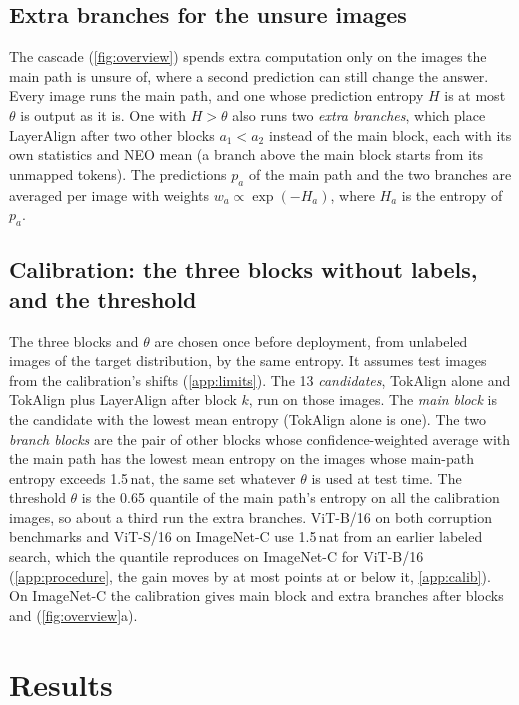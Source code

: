 \documentclass{article}
\newcommand{\tok}{TokAlign}
\newcommand{\layer}{LayerAlign}
\newcommand{\neo}{NEO}
\begin{document}
\subsection{Extra branches for the unsure images}
\label{sec:exit}
The cascade (\cref{fig:overview}) spends extra computation only on the images the main path is unsure of, where a second prediction can still change the answer. Every image runs the main path, and one whose prediction entropy $H$ is at most $\theta$ is output as it is. One with $H>\theta$ also runs two \emph{extra branches}, which place \layer{} after two other blocks $a_1<a_2$ instead of the main block, each with its own statistics and \neo{} mean (a branch above the main block starts from its unmapped tokens). The predictions $p_a$ of the main path and the two branches are averaged per image with weights $w_a\propto\exp(-H_a)$, where $H_a$ is the entropy of $p_a$.

\subsection{Calibration: the three blocks without labels, and the threshold}
\label{sec:calib}
The three blocks and $\theta$ are chosen once before deployment, from unlabeled images of the target distribution, by the same entropy. It assumes test images from the calibration's shifts (\cref{app:limits}). The 13 \emph{candidates}, \tok{} alone and \tok{} plus \layer{} after block $k$, run on those images. The \emph{main block} is the candidate with the lowest mean entropy (\tok{} alone is one). The two \emph{branch blocks} are the pair of other blocks whose confidence-weighted average with the main path has the lowest mean entropy on the images whose main-path entropy exceeds 1.5\,nat, the same set whatever $\theta$ is used at test time. The threshold $\theta$ is the 0.65 quantile of the main path's entropy on all the calibration images, so about a third run the extra branches. ViT-B/16 on both corruption benchmarks and ViT-S/16 on ImageNet-C use 1.5\,nat from an earlier labeled search, which the quantile reproduces on ImageNet-C for ViT-B/16 (\cref{app:procedure}, the gain moves by at most  points at or below it, \cref{app:calib}). On ImageNet-C the calibration gives main block  and extra branches after blocks  and  (\cref{fig:overview}a).

\section{Results}
\label{sec:results}
\end{document}
